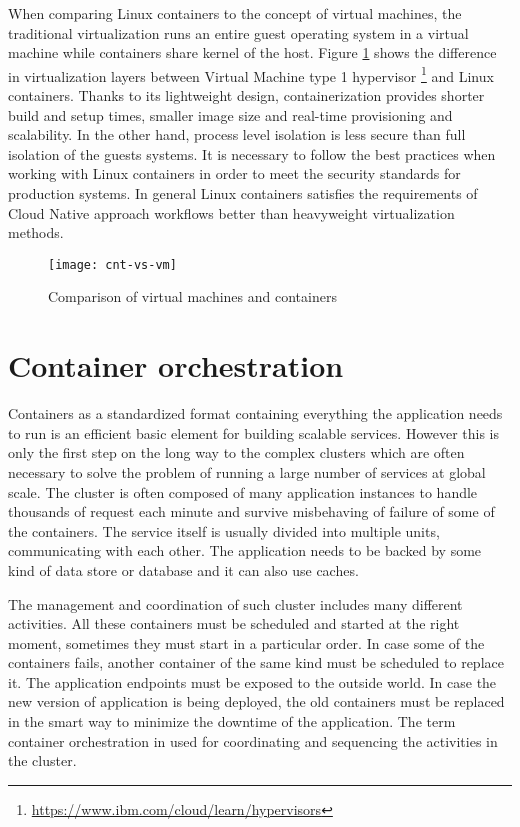 \documentclass[
  digital, %
  twoside, %
  table,   %
  lof,     %
  lot,     %
]{fithesis3}
\begin{document}
When comparing Linux containers to the concept of virtual machines, the traditional virtualization runs an entire guest operating system in a virtual machine while containers share kernel of the host. Figure \ref{fig:cnt-vs-vm} shows the difference in virtualization layers between Virtual Machine type 1 hypervisor \footnote{\url{https://www.ibm.com/cloud/learn/hypervisors}} and Linux containers. Thanks to its lightweight design, containerization provides shorter build and setup times, smaller image size and real-time provisioning and scalability. In the other hand, process level isolation is less secure than full isolation of the guests systems. It is necessary to follow the best practices when working with Linux containers in order to meet the security standards for production systems. In general Linux containers satisfies the requirements of Cloud Native approach workflows better than heavyweight virtualization methods.

\begin{figure}[H]
\caption{Comparison of virtual machines and containers}
\centering
\texttt{[image: cnt-vs-vm]}
\label{fig:cnt-vs-vm}
\end{figure}

\section{Container orchestration} \label{sec:orchestration}
Containers as a standardized format containing everything the application needs to run is an efficient basic element for building scalable services. However this is only the first step on the long way to the complex clusters which are often necessary to solve the problem of running a large number of services at global scale. The cluster is often composed of many application instances to handle thousands of request each minute and survive misbehaving of failure of some of the containers. The service itself is usually divided into multiple units, communicating with each other. The application needs to be backed by some kind of data store or database and it can also use caches.

The management and coordination of such cluster includes many different activities. All these containers must be scheduled and started at the right moment, sometimes they must start in a particular order. In case some of the containers fails, another container of the same kind must be scheduled to replace it. The application endpoints must be exposed to the outside world. In case the new version of application is being deployed, the old containers must be replaced in the smart way to minimize the downtime of the application. The term container orchestration in used for coordinating and sequencing the activities in the cluster.
\end{document}
